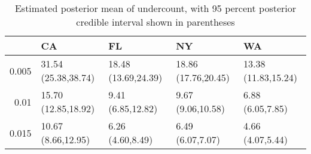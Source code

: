 \begin{table}[ht]
\centering
\begingroup\footnotesize
\begin{tabular}{rllll}
  \hline
 & CA & FL & NY & WA \\ 
  \hline
0.005 & 31.54 (25.38,38.74) & 18.48 (13.69,24.39) & 18.86 (17.76,20.45) & 13.38 (11.83,15.24) \\ 
  0.01 & 15.70 (12.85,18.92) & 9.41 (6.85,12.82) & 9.67 (9.06,10.58) & 6.88 (6.05,7.85) \\ 
  0.015 & 10.67 (8.66,12.95) & 6.26 (4.60,8.49) & 6.49 (6.07,7.07) & 4.66 (4.07,5.44) \\ 
   \hline
\end{tabular}
\endgroup
\caption{Estimated posterior mean of undercount, with 95 percent posterior credible interval shown in parentheses 
             \label{tab:undercount}} 
\end{table}
